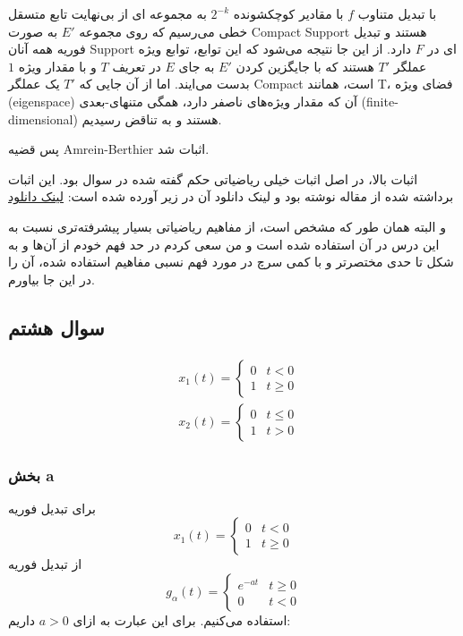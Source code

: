 \documentclass[12pt]{article}
\begin{document}
با تبدیل متناوب $f$ با مقادیر کوچکشونده $2^{-k}$ به مجموعه ای از بی‌نهایت تابع متسقل خطی می‌رسیم که روی مجموعه $E'$ به صورت Compact Support هستند و تبدیل فوریه همه آنان Support ای در $F$ دارد. از این جا نتیجه می‌شود که این توابع، توابع ویژه عملگر $T'$ هستند که با جایگزین کردن $E'$ به جای $E$ در تعریف $T$ و با مقدار ویژه $1$ بدست می‌ایند. اما از آن جایی که $T'$ یک عملگر Compact است، همانند T، فضای ویژه (eigenspace) آن که مقدار ویژه‌های ناصفر دارد، همگی متنهای-بعدی (finite-dimensional) هستند و به تناقض رسیدیم.

پس قضیه Amrein-Berthier اثبات شد.


اثبات بالا، در اصل اثبات خیلی ریاضیاتی حکم گفته شده در سوال بود. این اثبات برداشته شده از مقاله
نوشته
بود و لینک دانلود آن در زیر آورده شده است:
 \href{http://www.math.uchicago.edu/~may/REU2014/REUPapers/Talbut.pdf}{لینک دانلود}
 
 و البته همان طور که مشخص است، از مفاهیم ریاضیاتی بسیار پیشرفته‌تری نسبت به این درس در آن استفاده شده است و من سعی کردم در حد فهم خودم از آن‌ها و به شکل تا حدی مختصرتر و با کمی سرچ در مورد فهم نسبی مفاهیم استفاده شده، آن را در این جا بیاورم.
 
 

 \newpage
 
 \subsection{سوال هشتم}
 $$
 \begin{aligned}
 	&x_{1}(t)=\left\{\begin{array}{ll}
 		0 & t<0 \\
 		1 & t \geq 0
 	\end{array}\right. \\
 	&x_{2}(t)=\left\{\begin{array}{ll}
 		0 & t \leq 0 \\
 		1 & t>0
 	\end{array}\right.
 \end{aligned}
 $$
 
 
 \subsubsection{بخش a}
 
 برای تبدیل فوریه
 $$
 	x_{1}(t)=\left\{\begin{array}{ll}
 		0 & t<0 \\
 		1 & t \geq 0
 	\end{array}\right.
 $$
 از تبدیل فوریه 
 $$
 g_{\alpha}(t)=\left\{\begin{array}{ll}
 	e^{-a t} & t \geq 0 \\
 	0 & t<0
 \end{array}\right.
 $$
استفاده می‌کنیم.
برای این عبارت به ازای $a>0$ داریم:
\end{document}
